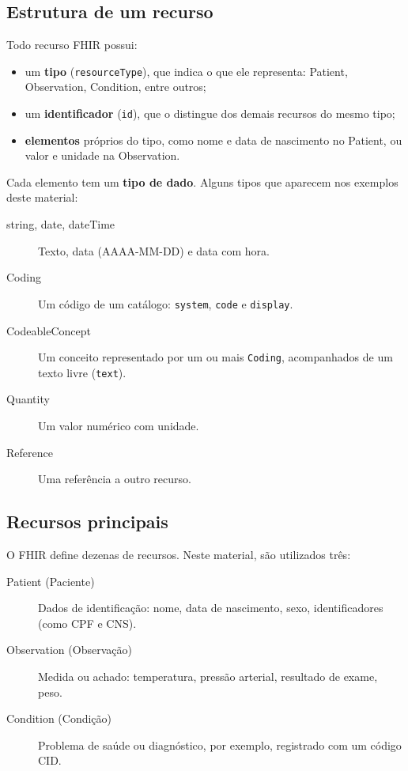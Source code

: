 \documentclass[11pt,a4paper]{article}
\newcommand{\codigo}[1]{\texttt{#1}}
\begin{document}
\subsection{Estrutura de um recurso}

Todo recurso FHIR possui:

\begin{itemize}
  \item um \textbf{tipo} (\codigo{resourceType}), que indica o que ele
    representa: Patient, Observation, Condition, entre outros;
  \item um \textbf{identificador} (\codigo{id}), que o distingue dos
    demais recursos do mesmo tipo;
  \item \textbf{elementos} próprios do tipo, como nome e data de
    nascimento no Patient, ou valor e unidade na Observation.
\end{itemize}

Cada elemento tem um \textbf{tipo de dado}. Alguns tipos que aparecem nos
exemplos deste material:

\begin{description}
  \item[string, date, dateTime] Texto, data (AAAA-MM-DD) e data com hora.
  \item[Coding] Um código de um catálogo: \codigo{system}, \codigo{code}
    e \codigo{display}.
  \item[CodeableConcept] Um conceito representado por um ou mais
    \codigo{Coding}, acompanhados de um texto livre (\codigo{text}).
  \item[Quantity] Um valor numérico com unidade.
  \item[Reference] Uma referência a outro recurso.
\end{description}

\subsection{Recursos principais}

O FHIR define dezenas de recursos. Neste material, são utilizados três:

\begin{description}
  \item[Patient (Paciente)] Dados de identificação: nome, data de
    nascimento, sexo, identificadores (como CPF e CNS).
  \item[Observation (Observação)] Medida ou achado: temperatura,
    pressão arterial, resultado de exame, peso.
  \item[Condition (Condição)] Problema de saúde ou diagnóstico, por
    exemplo, registrado com um código CID.
\end{description}
\end{document}
